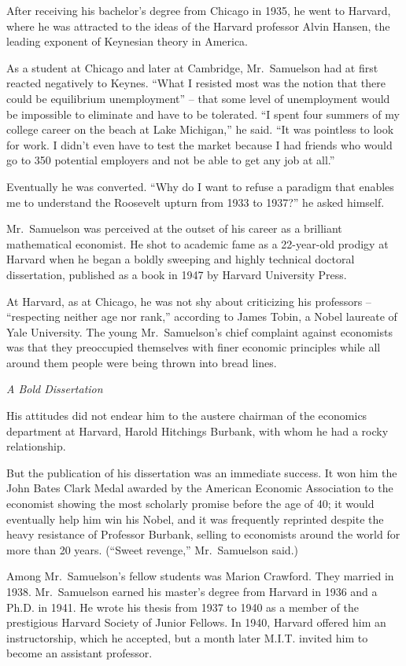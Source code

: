 ﻿\documentclass[12pt]{article}
\begin{document}
After receiving his bachelor's degree from Chicago in 1935, he went to Harvard, where he was
attracted to the ideas of the Harvard professor Alvin Hansen, the leading exponent of Keynesian
theory in America.

As a student at Chicago and later at Cambridge, Mr.~Samuelson had at first reacted negatively to
Keynes. ``What I resisted most was the notion that there could be equilibrium unemployment'' -- that
some level of unemployment would be impossible to eliminate and have to be tolerated. ``I spent four
summers of my college career on the beach at Lake Michigan,'' he said. ``It was pointless to look
for work. I didn't even have to test the market because I had friends who would go to 350 potential
employers and not be able to get any job at all.''

Eventually he was converted. ``Why do I want to refuse a paradigm that enables me to understand the
Roosevelt upturn from 1933 to 1937?'' he asked himself.

Mr.~Samuelson was perceived at the outset of his career as a brilliant mathematical economist. He
shot to academic fame as a 22-year-old prodigy at Harvard when he began a boldly sweeping and highly
technical doctoral dissertation, published as a book in 1947 by Harvard University Press.

At Harvard, as at Chicago, he was not shy about criticizing his professors -- ``respecting neither
age nor rank,'' according to James Tobin, a Nobel laureate of Yale University. The young
Mr.~Samuelson's chief complaint against economists was that they preoccupied themselves with finer
economic principles while all around them people were being thrown into bread lines.

\emph{A Bold Dissertation}

His attitudes did not endear him to the austere chairman of the economics department at Harvard,
Harold Hitchings Burbank, with whom he had a rocky relationship.

But the publication of his dissertation was an immediate success. It won him the John Bates Clark
Medal awarded by the American Economic Association to the economist showing the most scholarly
promise before the age of 40; it would eventually help him win his Nobel, and it was frequently
reprinted despite the heavy resistance of Professor Burbank, selling to economists around the world
for more than 20 years. (``Sweet revenge,'' Mr.~Samuelson said.)

Among Mr.~Samuelson's fellow students was Marion Crawford. They married in 1938. Mr.~Samuelson
earned his master's degree from Harvard in 1936 and a Ph.D. in 1941. He wrote his thesis from 1937
to 1940 as a member of the prestigious Harvard Society of Junior Fellows. In 1940, Harvard offered
him an instructorship, which he accepted, but a month later M.I.T. invited him to become an
assistant professor.
\end{document}
